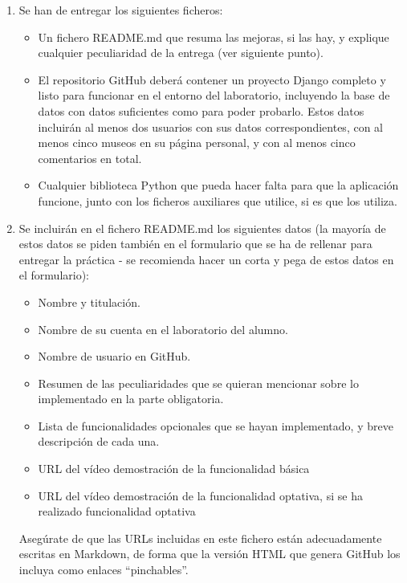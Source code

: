 \begin{enumerate}
  \item Se han de entregar los siguientes ficheros:

\begin{itemize}
  \item Un fichero README.md que resuma las mejoras, si las hay, y explique cualquier peculiaridad de la entrega (ver siguiente punto).
  \item El repositorio GitHub deberá contener un proyecto Django completo y listo para funcionar en el entorno del laboratorio, incluyendo la base de datos con datos suficientes como para poder probarlo. Estos datos incluirán al menos dos usuarios con sus datos correspondientes, con al menos cinco museos en su página personal, y con al menos cinco comentarios en total.
  \item Cualquier biblioteca Python que pueda hacer falta para que la aplicación funcione, junto con los ficheros auxiliares que utilice, si es que los utiliza.
\end{itemize}

  \item Se incluirán en el fichero README.md los siguientes datos (la mayoría de estos datos se piden también en el formulario que se ha de rellenar para entregar la práctica - se recomienda hacer un corta y pega de estos datos en el formulario):

\begin{itemize}
  \item Nombre y titulación.
  \item Nombre de su cuenta en el laboratorio del alumno.
  \item Nombre de usuario en GitHub.
  \item Resumen de las peculiaridades que se quieran mencionar sobre lo implementado en la parte obligatoria.
  \item Lista de funcionalidades opcionales que se hayan implementado, y breve descripción de cada una.
  \item URL del vídeo demostración de la funcionalidad básica
  \item URL del vídeo demostración de la funcionalidad optativa, si se ha realizado funcionalidad optativa
\end{itemize}

Asegúrate de que las URLs incluidas en este fichero están adecuadamente escritas en Markdown, de forma que la versión HTML que genera GitHub los incluya como enlaces ``pinchables''.

\end{enumerate}


